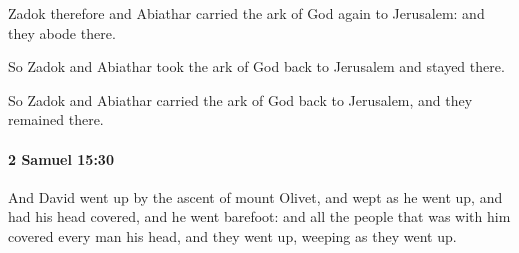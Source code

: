 			\begin{versebox}
					\item[BHS] 
					\item[ASV] Zadok therefore and Abiathar carried the ark of God again to Jerusalem: and they abode there.
					\item[NIV] So Zadok and Abiathar took the ark of God back to Jerusalem and stayed there.
					\item[NRSV] So Zadok and Abiathar carried the ark of God back to Jerusalem, and they remained there.
			\end{versebox}

		\paragraph{2 Samuel 15:30} %
			\label{2SAMUEL-15-30}

			And David went up by the ascent of mount Olivet, and wept as he went up, and had his head covered, and he went barefoot: and all the people that was with him covered every man his head, and they went up, weeping as they went up.

